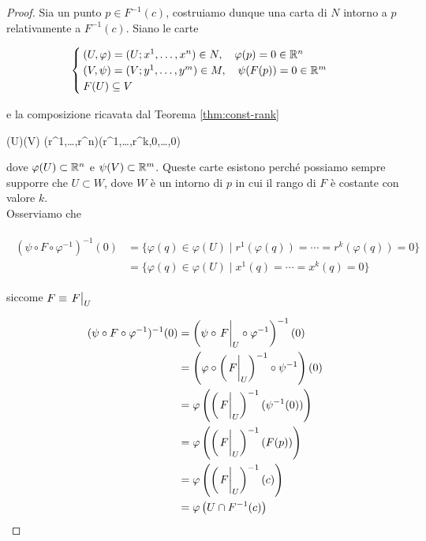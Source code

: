 \begin{proof}
	Sia un punto $ p \in F^{-1}(c) $, costruiamo dunque una carta di $ N $ intorno a $ p $ relativamente a $ F^{-1}(c) $. Siano le carte

	\begin{equation}
		\begin{cases}
			(U,\varphi) = (U; x^{1},\dots,x^{n}) \in N \qcomma \varphi(p) = 0 \in \R^{n} \\
			(V,\psi) = (V; y^{1},\dots,y^{m}) \in M \qcomma \psi(F(p)) = 0  \in \R^{m} \\
			F(U) \subseteq V
		\end{cases}
	\end{equation}

	e la composizione ricavata dal Teorema \ref{thm:const-rank}
	
		{\varphi(U)}{\psi(V)}
		{(r^{1},\dots,r^{n})}{(r^{1},\dots,r^{k},0,\dots,0)}

	dove $ \varphi(U) \subset \mathbb{R}^{n} $ e $ \psi(V) \subset \mathbb{R}^{m} $. Queste carte esistono perché possiamo sempre supporre che $ U \subset W $, dove $ W $ è un intorno di $ p $ in cui il rango di $ F $ è costante con valore $ k $. \\
	Osserviamo che
	
	\begin{align}
		\begin{split}
			(\psi \circ F \circ \varphi^{-1})^{-1}(0) &= \{ \varphi(q) \in \varphi(U) \mid r^{1}(\varphi(q)) = \cdots = r^{k}(\varphi(q)) = 0 \} \\
			&= \{ \varphi(q) \in \varphi(U) \mid x^{1}(q) = \cdots = x^{k}(q) = 0 \}
		\end{split}
	\end{align}

	siccome $ F \equiv \eval{F}_{U} $
	
	\begin{align}
		\begin{split}
			(\psi \circ F \circ \varphi^{-1})^{-1}(0) &= \left( \psi \circ \eval{F}_{U} \circ \varphi^{-1} \right)^{-1}(0) \\
			&= \left( \varphi \circ \left( \eval{F}_{U} \right)^{-1} \circ \psi^{-1} \right)(0) \\
			&= \varphi \left( \left( \eval{F}_{U} \right)^{-1}(\psi^{-1}(0)) \right) \\
			&= \varphi \left( \left( \eval{F}_{U} \right)^{-1}(F(p)) \right) \\
			&= \varphi \left( \left( \eval{F}_{U} \right)^{-1}(c) \right) \\
			&= \varphi \left( U \cap F^{-1}(c) \right)
		\end{split}
	\end{align}


\end{proof}
